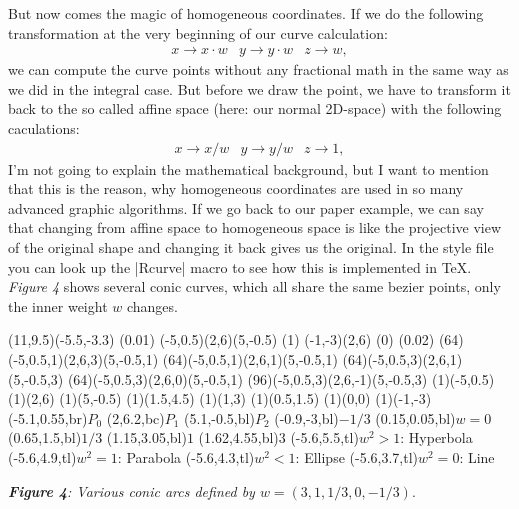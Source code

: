 \documentclass[titlepage,a4paper,11pt]{report}
\def\it{\textit}
\def\bf{\textbf}
\begin{document}
But now comes the magic of homogeneous coordinates. If we do the following
transformation at the very beginning of our curve calculation:
\begin{eqnarray}
  x \rightarrow x \cdot w & y \rightarrow y \cdot w & z \rightarrow w,
\end{eqnarray}
we can compute the curve points without any fractional math in the same way
as we did in the integral case. But before we draw the point, we have to
transform it back to the so called affine space (here: our normal 2D-space)
with the following caculations:
\begin{eqnarray}
  x \rightarrow x / w & y \rightarrow y / w & z \rightarrow 1,
\end{eqnarray}
I'm not going to explain the mathematical background, but I want to mention
that this is the reason, why homogeneous coordinates are used in so many
advanced graphic algorithms. If we go back to our paper example, we can say
that changing from affine space to homogeneous space is like the projective
view of the original shape and changing it back gives us the original. In the style file you can look up the |Rcurve| macro to see how this is
implemented in \TeX. \it{Figure 4} shows several conic curves, which all share the same bezier points, only the inner weight $w$ changes.
\begin{center}
\begin{lapdf}(11,9.5)(-5.5,-3.3)
  \Setwidth(0.01)
  \Black
  \Polygon(-5,0.5)(2,6)(5,-0.5) \Stroke
  \Dash(1)
  \Line(-1,-3)(2,6) \Stroke
  \Dash(0)
  \Setwidth(0.02)
  \Red
  \Rcurve(64)(-5,0.5,1)(2,6,3)(5,-0.5,1) \Stroke
  \Green
  \Rcurve(64)(-5,0.5,1)(2,6,1)(5,-0.5,1) \Stroke
  \Blue
  \Rcurve(64)(-5,0.5,3)(2,6,1)(5,-0.5,3) \Stroke
  \Cyan
  \Rcurve(64)(-5,0.5,3)(2,6,0)(5,-0.5,1) \Stroke
  \Magenta
  \Rcurve(96)(-5,0.5,3)(2,6,-1)(5,-0.5,3) \Stroke
  \Point(1)(-5,0.5)
  \Point(1)(2,6)
  \Point(1)(5,-0.5)
  \Point(1)(1.5,4.5)
  \Point(1)(1,3)
  \Point(1)(0.5,1.5)
  \Point(1)(0,0)
  \Point(1)(-1,-3)
  \Text(-5.1,0.55,br){$P_0$}
  \Text(2,6.2,bc){$P_1$}
  \Text(5.1,-0.5,bl){$P_2$}
  \Text(-0.9,-3,bl){$-1/3$}
  \Text(0.15,0.05,bl){$w=0$}
  \Text(0.65,1.5,bl){$1/3$}
  \Text(1.15,3.05,bl){$1$}
  \Text(1.62,4.55,bl){$3$}
  \Text(-5.6,5.5,tl){$w^2>1$: Hyperbola}
  \Text(-5.6,4.9,tl){$w^2=1$: Parabola}
  \Text(-5.6,4.3,tl){$w^2<1$: Ellipse}
  \Text(-5.6,3.7,tl){$w^2=0$: Line}
\end{lapdf}

\it{\bf{Figure 4}: Various conic arcs defined by $w=(3,1,1/3,0,-1/3)$}.
\end{center}
\end{document}
